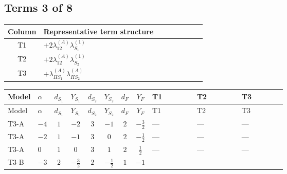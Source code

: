 \documentclass[8pt]{article}
\begin{document}
\begin{landscape}
\subsection*{Terms 3 of 8}
\begin{center}
\begin{tabular}{@{}c >{\raggedright\arraybackslash}p{0.82\linewidth}@{}}
\toprule
Column & Representative term structure \\
\midrule
T1 & \(\displaystyle +2 {\lambda_{12}^{(A)}} {\lambda_{S_1}^{(1)}}\) \\
\midrule
T2 & \(\displaystyle +2 {\lambda_{12}^{(A)}} {\lambda_{S_2}^{(1)}}\) \\
\midrule
T3 & \(\displaystyle +{\lambda_{HS_1}^{(A)}} {\lambda_{HS_2}^{(A)}}\) \\
\midrule
\bottomrule
\end{tabular}
\end{center}
\smallskip
\tiny
\begin{longtable}{@{}llcccccc >{\raggedright\arraybackslash}p{0.21\linewidth} >{\raggedright\arraybackslash}p{0.21\linewidth} >{\raggedright\arraybackslash}p{0.21\linewidth}@{}}
\toprule
Model & $\alpha$ & $d_{S_1}$ & $Y_{S_1}$ & $d_{S_2}$ & $Y_{S_2}$ & $d_F$ & $Y_F$ & T1 & T2 & T3 \\
\midrule
\endfirsthead
\toprule
Model & $\alpha$ & $d_{S_1}$ & $Y_{S_1}$ & $d_{S_2}$ & $Y_{S_2}$ & $d_F$ & $Y_F$ & T1 & T2 & T3 \\
\midrule
\endhead
T3-A & $-4$ & $1$ & $-2$ & $3$ & $-1$ & $2$ & $-\frac{3}{2}$ & --- & --- & --- \\
\midrule
T3-A & $-2$ & $1$ & $-1$ & $3$ & $0$ & $2$ & $-\frac{1}{2}$ & --- & --- & --- \\
\midrule
T3-A & $0$ & $1$ & $0$ & $3$ & $1$ & $2$ & $\frac{1}{2}$ & --- & --- & --- \\
\midrule
T3-B & $-3$ & $2$ & $-\frac{3}{2}$ & $2$ & $-\frac{1}{2}$ & $1$ & $-1$ & \scriptsize\adjustbox{max width=\linewidth}{$\begin{gathered} +2 {\lambda_{12}^{(A)}} {\lambda_{S_1}^{(1)}}\end{gathered}$} & \scriptsize\adjustbox{max width=\linewidth}{$\begin{gathered} +2 {\lambda_{12}^{(A)}} {\lambda_{S_2}^{(1)}}\end{gathered}$} & \scriptsize\adjustbox{max width=\linewidth}{$\begin{gathered} +{\lambda_{HS_1}^{(A)}} {\lambda_{HS_2}^{(A)}}\end{gathered}$} \\

\end{longtable}
\end{landscape}
\end{document}
